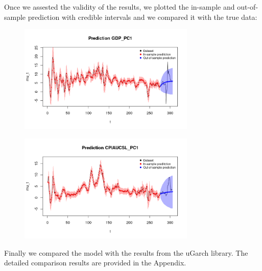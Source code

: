Once we assested the validity of the results, we plotted the in-sample and out-of-sample prediction with credible intervals and we compared it with the true data:
\begin{figure}[H]
    \centering
    \includegraphics[width=0.75\textwidth]{images/5-GARCH/gdp_prediction.png}
    \label{fig:GARCH_first}
\end{figure}
\begin{figure}[H]
    \centering
    \includegraphics[width=0.75\textwidth]{images/5-GARCH/infl_prediction.png}
    \label{fig:GARCH_second}
\end{figure}
Finally we compared the model with the results from the uGarch library. The detailed comparison results are provided in the Appendix. 
